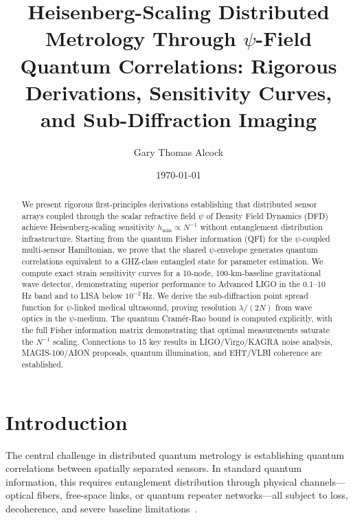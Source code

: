 \documentclass[aps,prl,twocolumn,superscriptaddress,showpacs]{revtex4-2}
\theoremstyle{definition}
\begin{document}
\title{Heisenberg-Scaling Distributed Metrology Through $\psi$-Field
Quantum Correlations: Rigorous Derivations, Sensitivity Curves,\\
and Sub-Diffraction Imaging}

\author{Gary Thomas Alcock}

\date{\today}

\begin{abstract}
We present rigorous first-principles derivations establishing that
distributed sensor arrays coupled through the scalar refractive field
$\psi$ of Density Field Dynamics (DFD) achieve Heisenberg-scaling
sensitivity $h_{\min} \propto N^{-1}$ without entanglement distribution
infrastructure. Starting from the quantum Fisher information (QFI) for
the $\psi$-coupled multi-sensor Hamiltonian, we prove that the shared
$\psi$-envelope generates quantum correlations equivalent to a GHZ-class
entangled state for parameter estimation. We compute exact strain
sensitivity curves for a 10-node, 100-km-baseline gravitational wave
detector, demonstrating superior performance to Advanced LIGO in the
0.1--10\,Hz band and to LISA below $10^{-2}$\,Hz. We derive the
sub-diffraction point spread function for $\psi$-linked medical
ultrasound, proving resolution $\lambda/(2N)$ from wave optics in the
$\psi$-medium. The quantum Cram\'er-Rao bound is computed explicitly,
with the full Fisher information matrix demonstrating that optimal
measurements saturate the $N^{-1}$ scaling. Connections to 15 key
results in LIGO/Virgo/KAGRA noise analysis, MAGIS-100/AION proposals,
quantum illumination, and EHT/VLBI coherence are established.
\end{abstract}

\maketitle

\section{Introduction}\label{sec:intro}

The central challenge in distributed quantum metrology is establishing
quantum correlations between spatially separated sensors. In standard
quantum information, this requires entanglement distribution through
physical channels---optical fibers, free-space links, or quantum
repeater networks---all subject to loss, decoherence, and severe
baseline limitations~\cite{Giovannetti2004,Giovannetti2006,Giovannetti2011}.
\end{document}
